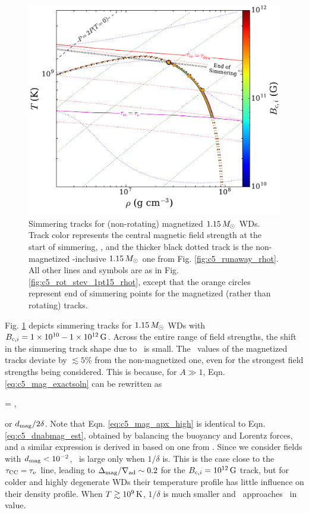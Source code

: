
\begin{figure}
\centering
\includegraphics[angle=0,width=0.8\columnwidth]{chapter5_zhu+16/figures/mag_1pt15_rhot.pdf}
\caption{Simmering tracks for (non-rotating) magnetized $1.15\,\Msun$ WDs.  Track color represents the central magnetic field strength at the start of simmering, \Binit, and the thicker black dotted track is the non-magnetized \dnabconv-inclusive $1.15\,\Msun$ one from Fig. \ref{fig:c5_runaway_rhot}.  All other lines and symbols are as in Fig. \ref{fig:c5_rot_stev_1pt15_rhot}, except that the orange circles represent end of simmering points for the magnetized (rather than rotating) tracks.}
\label{fig:c5_mag_1pt15_rhot}
\end{figure}

Fig. \ref{fig:c5_mag_1pt15_rhot} depicts simmering tracks for $1.15\,\Msun$ WDs with $\Binit = 1\times10^{10}-1\times10^{12}\,\mrm{G}$.  Across the entire range of field strengths, the shift in the simmering track shape due to \dnabmag\ is small.  The \rhoc\ values of the magnetized tracks deviate by $\lesssim5$\% from the non-magnetized one, even for the strongest field strengths being considered.  This is because, for $A \gg 1$, Eqn. \ref{eq:c5_mag_exactsoln} can be rewritten as

\eqbegin
\dnabmag \approx {} = ,
\label{eq:c5_mag_apx_high}
\eqend

\noindent or $\dmag/2\delta$.  Note that Eqn. \ref{eq:c5_mag_apx_high} is identical to Eqn. \ref{eq:c5_dnabmag_est}, obtained by balancing the buoyancy and Lorentz forces, and a similar expression is derived in \cite{macdm09} based on one from \cite{gougt66}.  Since we consider fields with $\dmag < 10^{-2}$, \dnabmag\ is large only when $1/\delta$ is.  This is the case close to the $\taucc = \taunu$ line, leading to $\dnabmag/\nablaad \sim 0.2$ for the $\Binit = 10^{12}\,\mrm{G}$ track, but for colder and highly degenerate WDs their temperature profile has little influence on their density profile.  When $T\gtrsim10^9\,\mathrm{K}$, $1/\delta$ is much smaller and \dnabmag\ approaches \dnabconv\ in value.

